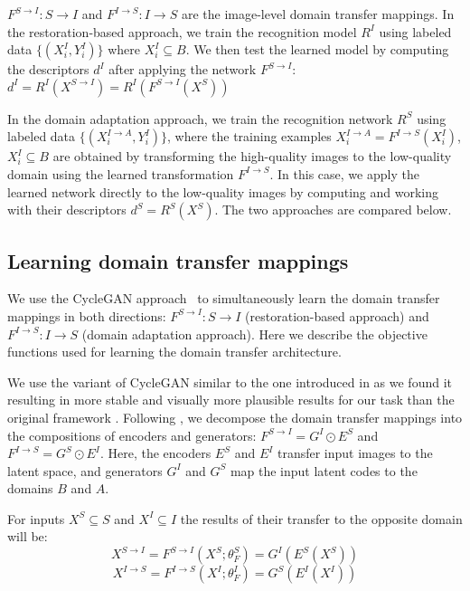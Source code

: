 $F^{S \rightarrow I}: S \longrightarrow I$ and $F^{I \rightarrow S}: I \longrightarrow S$ are the image-level domain transfer mappings. In the restoration-based approach, we train the recognition model $R^{I}$ using labeled data  $\{(X^{I}_{i}, Y^{I}_{i})\}$ where $X^{I}_{i} \subseteq B$. We then test the learned model by computing the descriptors $d^{I}$ after applying the network $F^{S \rightarrow I}$:  $d^{I} = R^{I}(X^{S\rightarrow I}) = R^{I}(F^{S \rightarrow I}(X^{S}))$

In the domain adaptation approach, we train the recognition network $R^{S}$ using labeled data $\{(X^{I \rightarrow A }_{i}, Y^{I}_{i})\}$, where the training examples $X^{I \rightarrow A }_{i} = F^{I \rightarrow S}(X^{I}_i)$, $X^{I}_i \subseteq B$ are obtained by transforming the high-quality images to the low-quality domain using the learned transformation $F^{I \rightarrow S}$. In this case, we apply the learned network directly to the low-quality images by computing and working with their descriptors $d^{S} = R^{S}(X^{S})$. The two approaches are compared below.



\subsection{Learning domain transfer mappings}
\label{sect:domain_transfer}
We use the CycleGAN approach~\cite{ZhuPIE17} to simultaneously learn the domain transfer mappings in both directions: $ F^{S \rightarrow I}: S  \longrightarrow I$ (restoration-based approach) and  $F^{I \rightarrow S}: I \longrightarrow S$ (domain adaptation approach). Here we describe the objective functions used for learning the domain transfer architecture.

We use the variant of CycleGAN similar to the one introduced in \cite{LiuNIPS2017} as we found it resulting in more stable and visually more plausible results for our task than the original framework \cite{ZhuPIE17}. Following \cite{LiuNIPS2017}, we decompose the domain transfer mappings into the compositions of encoders and generators: $F^{S \rightarrow I} = G^{I} \odot E^{S} $ and $F^{I \rightarrow S} = G^{S} \odot E^{I} $. Here, the encoders $E^{S}$ and $E^{I}$ transfer input images to the latent space, and generators $G^{I}$ and $G^{S}$ map the input latent codes to the domains $B$ and $A$.
 
For inputs $X^{S} \subseteq S $ and $X^{I} \subseteq I $ the results of their transfer to the opposite domain will be:
\begin{equation}
    X^{S \rightarrow I} = F^{S \rightarrow I}(X^{S}; \theta^{S}_F) = G^{I}(E^{S}(X^{S}))  
\end{equation}
\begin{equation}
    X^{I \rightarrow S} = F^{I \rightarrow S}(X^{I}; \theta^{I}_F) = G^{S}(E^{I}(X^{I}))
\end{equation}

